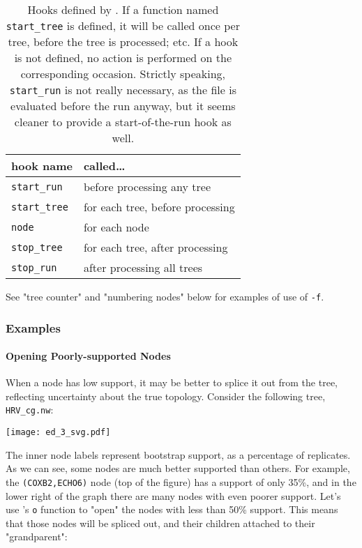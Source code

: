 \begin{table}
	\centering
	\begin{tabular}{ll}
		hook name & called\ldots \\
		\hline
		\texttt{start\_run} 	& before processing any tree \\
		\texttt{start\_tree}	& for each tree, before processing \\
		\texttt{node}					& for each node \\
		\texttt{stop\_tree}		& for each tree, after processing \\
		\texttt{stop\_run}			& after processing all trees
	\end{tabular}
	\caption{%
		\label{tbl:luaedHooks}
		Hooks defined by \luaed. If a function named \texttt{start\_tree} is
		defined, it will be called once per tree, before the tree is processed; etc.
		If a hook is not defined, no action is performed on the corresponding
		occasion. Strictly speaking, \texttt{start\_run} is not really necessary, as
		the file is evaluated before the run anyway, but it seems cleaner to provide
		a start-of-the-run hook as well.
	}
\end{table}

See "tree counter" and "numbering nodes" below for examples of use of
\texttt{-f}.

\subsubsection{Examples}

\paragraph{Opening Poorly-supported Nodes}
\label{sct:ed_ed}

When a node has low support, it may be better to splice it out from the tree,
reflecting uncertainty about the true topology. Consider the following tree, 
\texttt{HRV\_cg.nw}:

\begin{center}
\texttt{[image: ed\_3\_svg.pdf]}
\end{center}

\noindent{}The inner node labels represent bootstrap support, as a percentage of
replicates. As we can see, some nodes are much better supported than others.
For example, the \texttt{(COXB2,ECHO6)} node (top of the figure) has a support
of only 35\%, and in the lower right of the graph there are many nodes with even
poorer support. Let's use \luaed's \texttt{o} function to "open" the nodes with
less than 50\% support. This means that those nodes will be spliced out, and
their children attached to their "grandparent":

